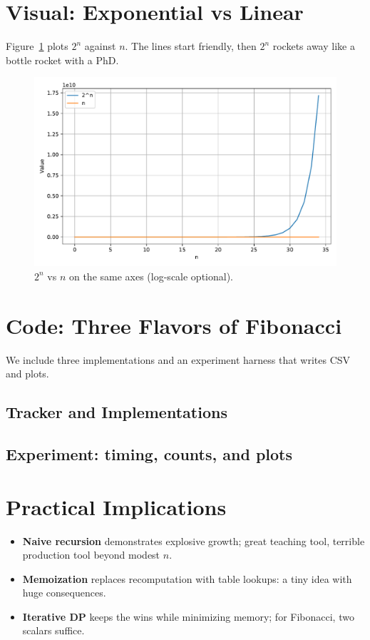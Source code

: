 \section{Visual: Exponential vs Linear}
Figure~\ref{fig:bigocurves} plots $2^n$ against $n$. The lines start friendly, then $2^n$ rockets away like a bottle rocket with a PhD.
\begin{figure}[htbp]
  \centering
  \includegraphics[width=.85\textwidth]{chapters/big_o_curves.pdf}
  \caption{$2^n$ vs $n$ on the same axes (log-scale optional).}
  \label{fig:bigocurves}
\end{figure}

\section{Code: Three Flavors of Fibonacci}
We include three implementations and an experiment harness that writes CSV and plots.

\subsection{Tracker and Implementations}


\subsection{Experiment: timing, counts, and plots}


\section{Practical Implications}
\begin{itemize}
  \item \textbf{Naive recursion} demonstrates explosive growth; great teaching tool, terrible production tool beyond modest $n$.
  \item \textbf{Memoization} replaces recomputation with table lookups: a tiny idea with huge consequences.
  \item \textbf{Iterative DP} keeps the wins while minimizing memory; for Fibonacci, two scalars suffice.
\end{itemize}

